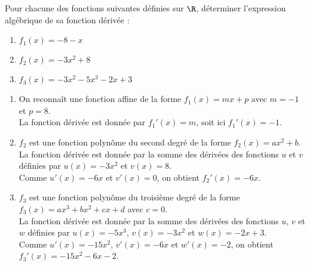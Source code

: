 \documentclass[a4paper,11pt,exos]{nsi} %
\begin{document}

\maketitle

\begin{exercice}
    Pour chacune des fonctions suivantes définies sur $\R$, déterminer l'expression algébrique de sa fonction dérivée :
    \begin{multicols}{3}
        \begin{enumerate}
            \item $f_1(x)=-8-x$
        
            \item $f_2(x)= -3x^2+8$
            \item $f_3(x)= -3x^2-5x^3-2x+3$
        \end{enumerate}
    \end{multicols}
    
    \end{exercice}

        \begin{enumerate}
            \item On reconnaît une fonction affine de la forme $f_1(x)=mx+p$ avec $m=-1$ et $p=8$.\\
            La fonction dérivée est donnée par $f_1'(x)=m$, soit ici $f_1'(x)=-1$.
        
            \item $f_2$ est une fonction polynôme du second degré de la forme $f_2(x)=ax^2+b$.\\
            La fonction dérivée est donnée par la somme des dérivées des fonctions $u$ et $v$ définies par $u(x)=-3x^2$ et $v(x)=8$.\\
             Comme $u'(x)=-6x$ et $v'(x)=0$, on obtient  $f_2'(x)=-6x$.
            
            \item $f_3$ est une fonction polynôme du troisième degré de la forme $f_3(x)=ax^3+bx^2+cx+d$ avec $c=0$.\\
            La fonction dérivée est donnée par la somme des dérivées des fonctions $u$, $v$ et $w$ définies par $u(x)=-5x^3$, $v(x)=-3x^2$ et $w(x)=-2x+3$.\\
             Comme $u'(x)=-15x^2$, $v'(x)=-6x$ et $w'(x)=-2$, on obtient  $f_3'(x)=-15x^2-6x-2$. 
        \end{enumerate}
\end{document}
